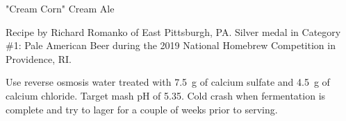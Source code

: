 \begin{recipe}{"Cream Corn" Cream Ale}

\begin{aboutblock}
Recipe by Richard Romanko of East Pittsburgh, PA. Silver medal in Category
\#1: Pale American Beer during the 2019 National Homebrew Competition
in Providence, RI. \sourceaha
\end{aboutblock}
 

\begin{methodandtiming}
 
\begin{mashsteps}
\end{mashsteps}

\begin{directions}
Use reverse osmosis water treated with 7.5~g of calcium sulfate and 4.5~g of calcium
chloride. Target mash pH of 5.35. Cold crash when fermentation is complete and
try to lager for a couple of weeks prior to serving.
\end{directions}

\end{methodandtiming}

\recipebreak

\begin{ingredientsblock}

\begin{malts}
\end{malts}

\begin{hops}
\end{hops}


\end{ingredientsblock}

\end{recipe}
